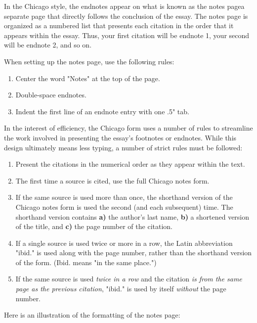 In the Chicago style, the endnotes appear on what is known as the notes 
page\textemdash a separate page that directly follows the conclusion of the essay. The 
notes page is organized as a numbered list that presents each citation in the order that 
it appears within the essay. Thus, your first citation will be endnote 1, your second will 
be endnote 2, and so on.

When setting up the notes page, use the following rules:

\begin{enumerate}
\item Center the word "Notes" at the top of the page.
\item Double-space endnotes.
\item Indent the first line of an endnote entry with one .5" tab.
\end{enumerate}

In the interest of efficiency, the Chicago form uses a number of rules to streamline the 
work involved in presenting the essay's footnotes or endnotes. While this design 
ultimately means less typing, a number of strict rules must be followed:

\begin{enumerate}
\item Present the citations in the numerical order as they appear within the text.

\item The first time a source is cited, use the full Chicago notes form.

\item If the same source is used more than once, the shorthand version of the Chicago 
notes form is used the second (and each subsequent) time. The shorthand version 
contains \textbf{a)} the author's last name, \textbf{b)} a shortened version of the title, 
and \textbf{c)} the page number of the citation.

\item If a single source is used twice or more in a row, the Latin abbreviation "ibid." is 
used along with the page number, rather than the shorthand version of the form. 
(Ibid. means "in the same place.")

\item If the same source is used \emph{twice in a row} and the citation \emph{is from 
the same page as the previous citation}, "ibid." is used by itself \emph{without} the 
page number. 
\end{enumerate}

Here is an illustration of the formatting of the notes page:
\newpage

